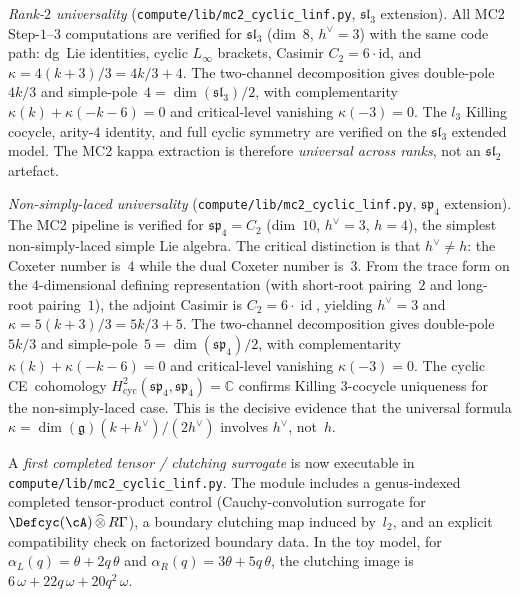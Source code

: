 \item \emph{Rank-$2$ universality}
  \textup{(}\nolinkurl{compute/lib/mc2_cyclic_linf.py}, $\mathfrak{sl}_3$
  extension\textup{)}.
  All MC2 Step-$1$--$3$ computations are verified for
  $\mathfrak{sl}_3$ (dim~$8$, $h^\vee=3$) with the same code path:
  dg~Lie identities, cyclic $L_\infty$ brackets, Casimir
  $C_2=6\cdot\mathrm{id}$, and
  $\kappa = 4(k+3)/3 = 4k/3 + 4$.
  The two-channel decomposition gives double-pole $4k/3$ and
  simple-pole~$4=\dim(\mathfrak{sl}_3)/2$,
  with complementarity $\kappa(k)+\kappa(-k-6)=0$ and
  critical-level vanishing $\kappa(-3)=0$.
  The $l_3$ Killing cocycle, arity-$4$ identity, and full cyclic
  symmetry are verified on the $\mathfrak{sl}_3$ extended model.
  The MC2 kappa extraction is therefore \emph{universal across ranks},
  not an $\mathfrak{sl}_2$ artefact.

\item \emph{Non-simply-laced universality}
  \textup{(}\nolinkurl{compute/lib/mc2_cyclic_linf.py}, $\mathfrak{sp}_4$
  extension\textup{)}.
  The MC2 pipeline is verified for
  $\mathfrak{sp}_4 = C_2$ (dim~$10$, $h^\vee=3$, $h=4$),
  the simplest non-simply-laced simple Lie algebra.
  The critical distinction is that $h^\vee \neq h$: the Coxeter
  number is~$4$ while the dual Coxeter number is~$3$.
  From the trace form on the $4$-dimensional defining representation
  (with short-root pairing~$2$ and long-root pairing~$1$),
  the adjoint Casimir is $C_2 = 6 \cdot \operatorname{id}$,
  yielding $h^\vee = 3$ and
  $\kappa = 5(k+3)/3 = 5k/3 + 5$.
  The two-channel decomposition gives double-pole $5k/3$ and
  simple-pole~$5 = \dim(\mathfrak{sp}_4)/2$,
  with complementarity $\kappa(k) + \kappa(-k-6) = 0$ and
  critical-level vanishing $\kappa(-3) = 0$.
  The cyclic CE~cohomology
  $H^2_{\mathrm{cyc}}(\mathfrak{sp}_4,\mathfrak{sp}_4) = \mathbb{C}$
  confirms Killing $3$-cocycle uniqueness for the non-simply-laced case.
  This is the decisive evidence that the universal formula
  $\kappa = \dim(\mathfrak{g})(k+h^\vee)/(2h^\vee)$ involves
  $h^\vee$, not~$h$.

\item A \emph{first completed tensor / clutching surrogate}
  is now executable in
  \nolinkurl{compute/lib/mc2_cyclic_linf.py}.
  The module includes a genus-indexed completed tensor-product control
  (Cauchy-convolution surrogate for
  $\Defcyc(\cA)\,\widehat{\otimes}\,R\Gamma$),
  a boundary clutching map induced by~$l_2$,
  and an explicit compatibility check on factorized boundary data.
  In the toy model, for
  $\alpha_L(q)=\theta+2q\,\theta$ and
  $\alpha_R(q)=3\theta+5q\,\theta$, the clutching image is
  $6\,\omega + 22q\,\omega + 20q^2\,\omega$.

